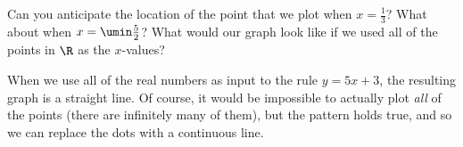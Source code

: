 
Can you anticipate the location of the point that we plot when $x = \frac{1}{3}$? What about when $x = \umin\frac{5}{2}$? What would our graph look like if we used all of the points in $\R$ as the $x$-values?

When we use all of the real numbers as input to the rule $y = 5x + 3$, the resulting graph is a straight line. Of course, it would be impossible to actually plot \textit{all} of the points (there are infinitely many of them), but the pattern holds true, and so we can replace the dots with a continuous line.

\begin{center}
\end{center}



